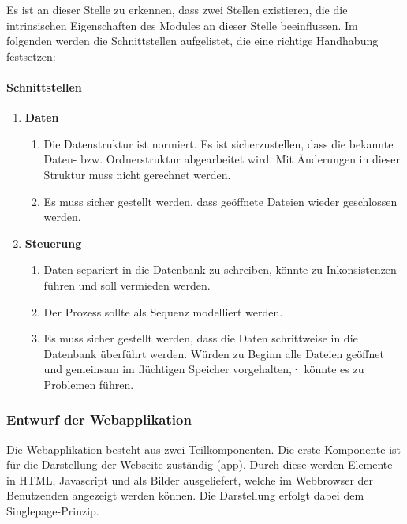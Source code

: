 Es ist an dieser Stelle zu erkennen, dass zwei Stellen existieren, die die intrinsischen Eigenschaften des Modules an dieser Stelle beeinflussen. Im folgenden werden die Schnittstellen aufgelistet, die eine richtige Handhabung festsetzen:

\paragraph{Schnittstellen}

\begin{enumerate}

\item \textbf{Daten}  
    \begin{enumerate}
        \item Die Datenstruktur ist normiert. Es ist sicherzustellen, dass die bekannte Daten- bzw. Ordnerstruktur abgearbeitet wird. Mit Änderungen in dieser Struktur muss nicht gerechnet werden.
        \item Es muss sicher gestellt werden, dass geöffnete Dateien wieder geschlossen werden.
    \end{enumerate}

\item \textbf{Steuerung} 
    \begin{enumerate}
        \item Daten separiert in die Datenbank zu schreiben, könnte zu Inkonsistenzen führen und soll vermieden werden.
        \item Der Prozess sollte als Sequenz modelliert werden.
        \item Es muss sicher gestellt werden, dass die Daten schrittweise in die Datenbank überführt werden. Würden zu Beginn alle Dateien geöffnet und gemeinsam im flüchtigen Speicher vorgehalten,· könnte es zu Problemen führen.
    \end{enumerate}

\end{enumerate}

        

\subsubsection{Entwurf der Webapplikation}

Die Webapplikation besteht aus zwei Teilkomponenten. Die erste Komponente ist für die Darstellung der Webseite zuständig (app). Durch diese werden Elemente in  HTML, Javascript und als Bilder ausgeliefert, welche im Webbrowser der Benutzenden angezeigt werden können. Die Darstellung erfolgt dabei dem Singlepage-Prinzip.  

